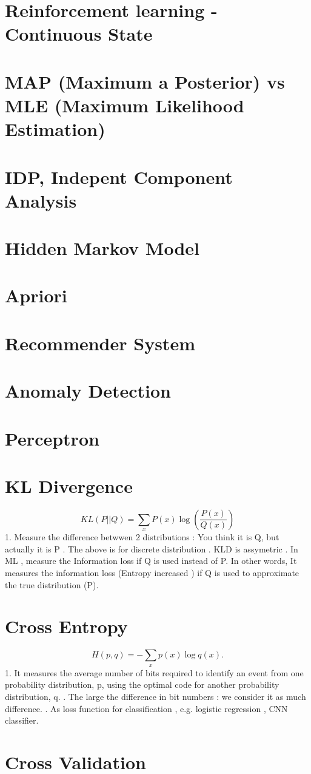 \documentclass{article}
\begin{document}
\section{Reinforcement learning - Continuous State}
\section{MAP (Maximum a Posterior) vs MLE (Maximum Likelihood Estimation)} 
\section{IDP, Indepent Component Analysis}

\section{Hidden Markov Model}
\section{Apriori}
\section{Recommender System}
\section{Anomaly Detection} 
\section{Perceptron}
\section{KL Divergence } 
\[KL(P||Q)=\sum_{x}P(x)\log(\frac{P(x)}{Q(x)})\] 
1. Measure the difference betwwen 2 distributions : You think it is Q, but actually it is P  . The above is for discrete distribution . KLD is assymetric . In ML , measure the Information loss if Q is used instead of P. In other words, It measures the information loss (Entropy increased ) if Q is used to approximate the true distribution (P).  
\section{Cross Entropy}
\[H(p,q)=-\sum_x p(x)\log q(x).\]
1. It measures the average number of bits required to identify an event from one probability distribution, p, using the optimal code for another probability distribution, q. . The large the difference in bit numbers : we consider it as much difference. . As loss function for classification , e.g. logistic regression , CNN classifier. \newline
\section{Cross Validation}
\end{document}
